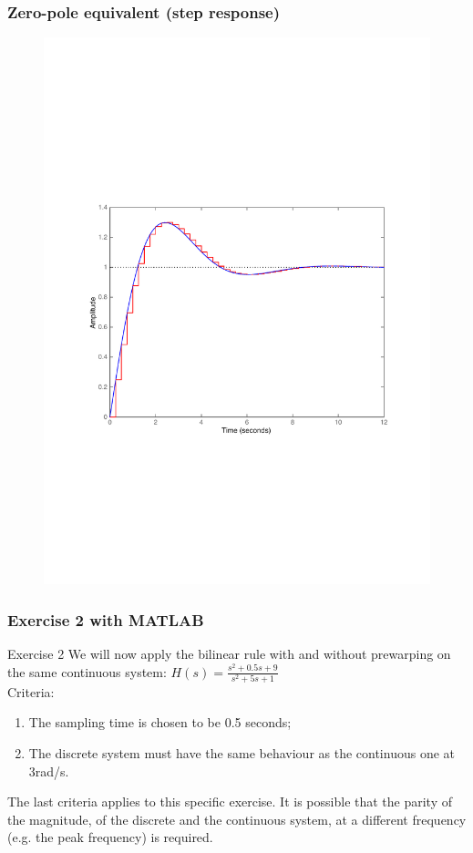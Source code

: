 \begin{frame}
	\frametitle{Zero-pole equivalent (step response)}
	\vspace{-0.7em}
	\begin{figure}
		\centering
		\includegraphics[width=0.8\linewidth]{vb4}
	\end{figure}
\end{frame}

\begin{frame}
	\frametitle{Exercise 2 with MATLAB}
	\begin{block}{Exercise 2}
		We will now apply the bilinear rule with and without prewarping on the same continuous system: $H(s) = \frac{s^{2} + 0.5s + 9}{s^{2} + 5s + 1}$\\
		\vspace{0.5em}
		Criteria: 
		\begin{enumerate}
			\item The sampling time is chosen to be 0.5 seconds;\\
			\item The discrete system must have the same behaviour as the continuous one at 3rad/s.
		\end{enumerate}
		\vspace{0.5em}
		The last criteria applies to this specific exercise. It is possible that the parity of the magnitude, of the discrete and the continuous system, at a different frequency (e.g. the peak frequency) is required.
	\end{block}	
\end{frame}
		
